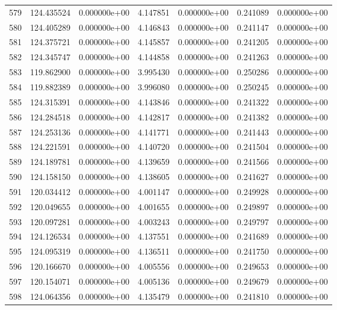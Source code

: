 \begin{tabular}{rrrrrrr}
 579 & 124.435524 &  0.000000e+00 &  4.147851 &  0.000000e+00 &    0.241089 &  0.000000e+00 \\
 580 & 124.405289 &  0.000000e+00 &  4.146843 &  0.000000e+00 &    0.241147 &  0.000000e+00 \\
 581 & 124.375721 &  0.000000e+00 &  4.145857 &  0.000000e+00 &    0.241205 &  0.000000e+00 \\
 582 & 124.345747 &  0.000000e+00 &  4.144858 &  0.000000e+00 &    0.241263 &  0.000000e+00 \\
 583 & 119.862900 &  0.000000e+00 &  3.995430 &  0.000000e+00 &    0.250286 &  0.000000e+00 \\
 584 & 119.882389 &  0.000000e+00 &  3.996080 &  0.000000e+00 &    0.250245 &  0.000000e+00 \\
 585 & 124.315391 &  0.000000e+00 &  4.143846 &  0.000000e+00 &    0.241322 &  0.000000e+00 \\
 586 & 124.284518 &  0.000000e+00 &  4.142817 &  0.000000e+00 &    0.241382 &  0.000000e+00 \\
 587 & 124.253136 &  0.000000e+00 &  4.141771 &  0.000000e+00 &    0.241443 &  0.000000e+00 \\
 588 & 124.221591 &  0.000000e+00 &  4.140720 &  0.000000e+00 &    0.241504 &  0.000000e+00 \\
 589 & 124.189781 &  0.000000e+00 &  4.139659 &  0.000000e+00 &    0.241566 &  0.000000e+00 \\
 590 & 124.158150 &  0.000000e+00 &  4.138605 &  0.000000e+00 &    0.241627 &  0.000000e+00 \\
 591 & 120.034412 &  0.000000e+00 &  4.001147 &  0.000000e+00 &    0.249928 &  0.000000e+00 \\
 592 & 120.049655 &  0.000000e+00 &  4.001655 &  0.000000e+00 &    0.249897 &  0.000000e+00 \\
 593 & 120.097281 &  0.000000e+00 &  4.003243 &  0.000000e+00 &    0.249797 &  0.000000e+00 \\
 594 & 124.126534 &  0.000000e+00 &  4.137551 &  0.000000e+00 &    0.241689 &  0.000000e+00 \\
 595 & 124.095319 &  0.000000e+00 &  4.136511 &  0.000000e+00 &    0.241750 &  0.000000e+00 \\
 596 & 120.166670 &  0.000000e+00 &  4.005556 &  0.000000e+00 &    0.249653 &  0.000000e+00 \\
 597 & 120.154071 &  0.000000e+00 &  4.005136 &  0.000000e+00 &    0.249679 &  0.000000e+00 \\
 598 & 124.064356 &  0.000000e+00 &  4.135479 &  0.000000e+00 &    0.241810 &  0.000000e+00 \\

\end{tabular}
